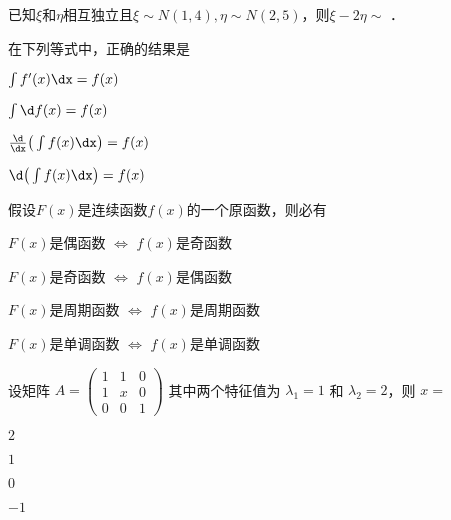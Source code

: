 \documentclass{njustexam}
\begin{document}
\begin{problem}
已知$\xi$和$\eta$相互独立且$\xi\sim N(1,4), \eta\sim N(2,5)$，则$\xi-2\eta\sim$ ．
\end{problem}



\begin{problem}
在下列等式中，正确的结果是
\begin{abcd}
\item $\int f'(x)\dx=f(x)$
\item $\int \d f(x)=f(x)$
\item $\frac{\d}{\dx}\big(\int f(x)\dx\big)=f(x)$
\item $\d\big(\int f(x)\dx\big)=f(x)$
\end{abcd}
\end{problem}

\bigskip

\begin{problem}
假设$F(x)$是连续函数$f(x)$的一个原函数，则必有
\begin{abcd}
\item $F(x)$是偶函数 $\Leftrightarrow$ $f(x)$是奇函数
\item $F(x)$是奇函数 $\Leftrightarrow$ $f(x)$是偶函数
\item $F(x)$是周期函数 $\Leftrightarrow$ $f(x)$是周期函数
\item $F(x)$是单调函数 $\Leftrightarrow$ $f(x)$是单调函数
\end{abcd}
\end{problem}

\bigskip

\begin{problem}
设矩阵 $A = \left(\begin{array}{ccc}
  1 & 1 & 0\\
  1 & x & 0\\
  0 & 0 & 1
\end{array}\right)$ 其中两个特征值为 $\lambda_1 = 1$ 和 $\lambda_2
= 2$，则 $x=$ 
\begin{abcd}
\item $2$
\item $1$
\item $0$
\item $-1$
\end{abcd}
\end{problem}

\bigskip
\end{document}
